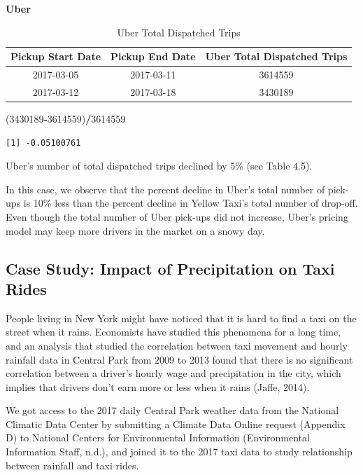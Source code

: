 \documentclass[12pt,twoside]{reedthesis}
\newenvironment{Shaded}{\begin{snugshade}}{\end{snugshade}}
\newcommand{\DecValTok}[1]{\textcolor[rgb]{0.00,0.00,0.81}{#1}}
\newcommand{\OperatorTok}[1]{\textcolor[rgb]{0.81,0.36,0.00}{\textbf{#1}}}
\newcommand{\NormalTok}[1]{#1}
\theoremstyle{definition}
\theoremstyle{definition}
\theoremstyle{definition}
\theoremstyle{remark}
\begin{document}
\textbf{Uber}
\begin{table}

\caption{\label{tab:unnamed-chunk-73}Uber Total Dispatched Trips}
\centering
\begin{tabular}[t]{ccc}
\toprule
Pickup Start Date & Pickup End Date & Uber Total Dispatched Trips\\
\midrule
2017-03-05 & 2017-03-11 & 3614559\\
2017-03-12 & 2017-03-18 & 3430189\\
\bottomrule
\end{tabular}
\end{table}
\begin{Shaded}
\begin{Highlighting}[]
\NormalTok{(}\DecValTok{3430189}\OperatorTok{-}\DecValTok{3614559}\NormalTok{)}\OperatorTok{/}\DecValTok{3614559}
\end{Highlighting}
\end{Shaded}
\begin{verbatim}
[1] -0.05100761
\end{verbatim}
Uber's number of total dispatched trips declined by 5\% (see Table 4.5).

In this case, we observe that the percent decline in Uber's total number
of pick-ups is 10\% less than the percent decline in Yellow Taxi's total
number of drop-off. Even though the total number of Uber pick-ups did
not increase, Uber's pricing model may keep more drivers in the market
on a snowy day.

\subsection{Case Study: Impact of Precipitation on Taxi
Rides}\label{case-study-impact-of-precipitation-on-taxi-rides}

People living in New York might have noticed that it is hard to find a
taxi on the street when it rains. Economists have studied this phenomena
for a long time, and an analysis that studied the correlation between
taxi movement and hourly rainfall data in Central Park from 2009 to 2013
found that there is no significant correlation between a driver's hourly
wage and precipitation in the city, which implies that drivers don't
earn more or less when it rains (Jaffe, 2014).

We got access to the 2017 daily Central Park weather data from the
National Climatic Data Center by submitting a Climate Data Online
request (Appendix D) to National Centers for Environmental Information
(Environmental Information Staff, n.d.), and joined it to the 2017 taxi
data to study relationship between rainfall and taxi rides.
\end{document}
